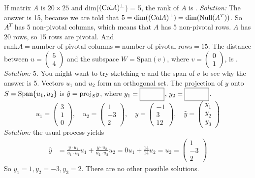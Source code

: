 \fi 
\ifnum {}
    If matrix $A$ is $20\times 25$ and dim($(\text{Col} A)^{\perp}$) = 5, the rank of $A$ is \framebox{\strut\hspace{1cm}}.
    \ifnum {} {\color{DarkBlue} \textit{Solution:} The answer is 15, because we are told that $5 = \dim ((\text{Col} A)^{\perp}) = \dim(\text{Null} (A^T))$. So $A^T$ has 5 non-pivotal columns, which means that $A$ has 5 non-pivotal rows. $A$ has 20 rows, so 15 rows are pivotal. And $\text{rank} A = \text{number of pivotal columns} = \text{number of pivotal rows} = 15$.   } \fi    
\fi 
\ifnum {}
    The distance between $u=\begin{pmatrix} 5\\4\end{pmatrix}$ and the subspace $W=\text{Span}(v)$, where $v = \begin{pmatrix} 0\\1\end{pmatrix}$, is \framebox{\strut\hspace{1cm}}.     
    \ifnum {} {\color{DarkBlue} \textit{Solution:} 5. You might want to try sketching $u$ and the span of $v$ to see why the answer is 5.   } \fi    
\fi 
\ifnum {} 
    Vectors $u_1$ and $u_2$ form an orthogonal set. The projection of $y$ onto $S=\text{Span}\{u_1,u_2\}$ is $\hat y = \text{proj}_Sy$, where $y_1=\framebox{\strut\hspace{1cm}}$, 
    $y_2=\framebox{\strut\hspace{1cm}}$. 
    $$
    u_1 = \begin{pmatrix} 3\\1\\0\end{pmatrix}, \quad 
    u_2 = \begin{pmatrix} 1\\-3\\2\end{pmatrix}, \quad 
    y = \begin{pmatrix} -1\\3\\12\end{pmatrix}, \quad 
    \hat y = \begin{pmatrix} y_1\\y_2\\y_3\end{pmatrix}
    $$
    \ifnum {} {\color{DarkBlue} \textit{Solution:} the usual process yields
    \begin{align}
        \hat y &= \frac{y\cdot u_1}{u_1 \cdot u_1}u_1 + \frac{y\cdot u_2}{u_2 \cdot u_2}u_2 
        = 0u_1 + \frac{14}{14}u_2 = u_2 
        = \begin{pmatrix} 1\\-3\\2\end{pmatrix} 
    \end{align}
    So $y_1=1, y_2=-3, y_3=2$. There are no other possible solutions. } \fi  
